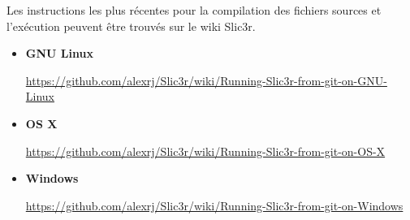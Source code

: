 Les instructions les plus r\'ecentes pour la compilation des fichiers sources et l'ex\'ecution peuvent \^etre trouv\'es sur le wiki Slic3r.

\begin{itemize}
    \item \textbf{GNU Linux} \par\url{https://github.com/alexrj/Slic3r/wiki/Running-Slic3r-from-git-on-GNU-Linux}
    \item \textbf{OS X} \par\url{https://github.com/alexrj/Slic3r/wiki/Running-Slic3r-from-git-on-OS-X}
    \item \textbf{Windows} \par\url{https://github.com/alexrj/Slic3r/wiki/Running-Slic3r-from-git-on-Windows}

\end{itemize}
